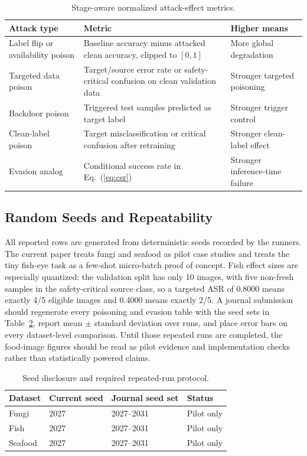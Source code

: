 ﻿\documentclass[6p,10pt,times]{ieeeaccess}
\begin{document}
\begin{table}[t]
\centering
\caption{Stage-aware normalized attack-effect metrics.}
\label{tab:metrics}
\small
\begin{tabular}{p{}p{}p{}}
\toprule
Attack type & Metric & Higher means \\
\midrule
Label flip or availability poison & Baseline accuracy minus attacked clean accuracy, clipped to \([0,1]\) & More global degradation \\
Targeted data poison & Target/source error rate or safety-critical confusion on clean validation data & Stronger targeted poisoning \\
Backdoor poison & Triggered test samples predicted as target label & Stronger trigger control \\
Clean-label poison & Target misclassification or critical confusion after retraining & Stronger clean-label effect \\
Evasion analog & Conditional success rate in Eq.~(\ref{eq:csr}) & Stronger inference-time failure \\
\bottomrule
\end{tabular}
\end{table}

\subsection{Random Seeds and Repeatability}

All reported rows are generated from deterministic seeds recorded by the runners. The current paper treats fungi and seafood as pilot case studies and treats the tiny fish-eye task as a few-shot micro-batch proof of concept. Fish effect sizes are especially quantized: the validation split has only 10 images, with five non-fresh samples in the safety-critical source class, so a targeted ASR of 0.8000 means exactly 4/5 eligible images and 0.4000 means exactly 2/5. A journal submission should regenerate every poisoning and evasion table with the seed sets in Table~\ref{tab:seeds}, report mean \(\pm\) standard deviation over runs, and place error bars on every dataset-level comparison. Until those repeated runs are completed, the food-image figures should be read as pilot evidence and implementation checks rather than statistically powered claims.

\begin{table}[t]
\centering
\caption{Seed disclosure and required repeated-run protocol.}
\label{tab:seeds}
\small
\begin{tabular}{p{}p{}p{}p{}}
\toprule
Dataset & Current seed & Journal seed set & Status \\
\midrule
Fungi & 2027 & 2027--2031 & Pilot only \\
Fish & 2027 & 2027--2031 & Pilot only \\
Seafood & 2027 & 2027--2031 & Pilot only \\
\bottomrule
\end{tabular}
\end{table}
\end{document}
